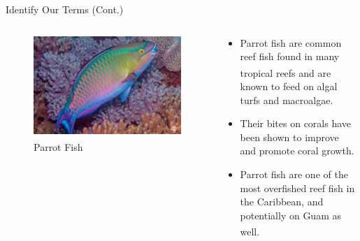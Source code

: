 \documentclass{beamer}
\begin{document}
\begin{frame}{Identify Our Terms (Cont.)}
    \begin{columns}
        \begin{column}{0.5\textwidth}
            \begin{figure}
                \centering
                \includegraphics[width=1\textwidth]{Latex/Figures/parrot_fish.jpg}
                \caption{Parrot Fish\textsuperscript{\cite{img_parrot_fish}}}
                \label{fig:my_label}
            \end{figure}
        \end{column}
        \begin{column}{0.5\textwidth}
            \begin{itemize}
                \item Parrot fish are common reef fish found in many tropical reefs\textsuperscript{\cite{13_blackwood_hastings_mumby_2010}} and are known to feed on algal turfs and macroalgae.
                \item Their bites on corals have been shown to improve and promote coral growth.
                \item Parrot fish are one of the most overfished reef fish in the Caribbean, and potentially on Guam as well\textsuperscript{\cite{13_blackwood_hastings_mumby_2010}}.
            \end{itemize}
        \end{column}
    \end{columns}
\end{frame}
\end{document}
